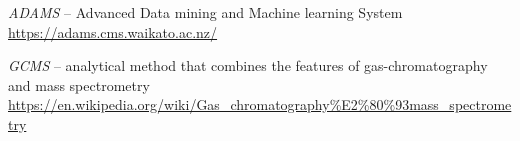 %

\begin{thebibliography}{999}

		\textit{ADAMS} -- Advanced Data mining and Machine learning System \\
		\url{https://adams.cms.waikato.ac.nz/}{}

                \textit{GCMS} -- analytical method that combines the features
                of gas-chromatography and mass spectrometry \\
		\url{https://en.wikipedia.org/wiki/Gas\_chromatography\%E2\%80\%93mass_spectrometry}{}

\end{thebibliography}
